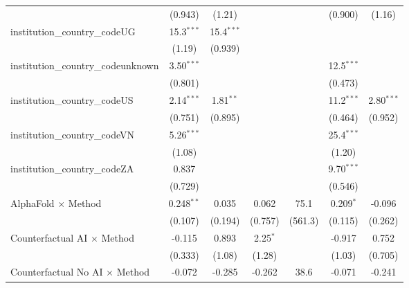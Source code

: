 \begin{tabular}{lcccccc}
                                         & (0.943)        & (1.21)        &               &            & (0.900)       & (1.16)\\   
   institution\_country\_codeUG          & 15.3$^{***}$   & 15.4$^{***}$  &               &            &               &   \\   
                                         & (1.19)         & (0.939)       &               &            &               &   \\   
   institution\_country\_codeunknown     & 3.50$^{***}$   &               &               &            & 12.5$^{***}$  &   \\   
                                         & (0.801)        &               &               &            & (0.473)       &   \\   
   institution\_country\_codeUS          & 2.14$^{***}$   & 1.81$^{**}$   &               &            & 11.2$^{***}$  & 2.80$^{***}$\\   
                                         & (0.751)        & (0.895)       &               &            & (0.464)       & (0.952)\\   
   institution\_country\_codeVN          & 5.26$^{***}$   &               &               &            & 25.4$^{***}$  &   \\   
                                         & (1.08)         &               &               &            & (1.20)        &   \\   
   institution\_country\_codeZA          & 0.837          &               &               &            & 9.70$^{***}$  &   \\   
                                         & (0.729)        &               &               &            & (0.546)       &   \\   
   AlphaFold $\times$ Method             & 0.248$^{**}$   & 0.035         & 0.062         & 75.1       & 0.209$^{*}$   & -0.096\\   
                                         & (0.107)        & (0.194)       & (0.757)       & (561.3)    & (0.115)       & (0.262)\\   
   Counterfactual AI $\times$ Method     & -0.115         & 0.893         & 2.25$^{*}$    &            & -0.917        & 0.752\\   
                                         & (0.333)        & (1.08)        & (1.28)        &            & (1.03)        & (0.705)\\   
   Counterfactual No AI $\times$ Method  & -0.072         & -0.285        & -0.262        & 38.6       & -0.071        & -0.241\\   

\end{tabular}
